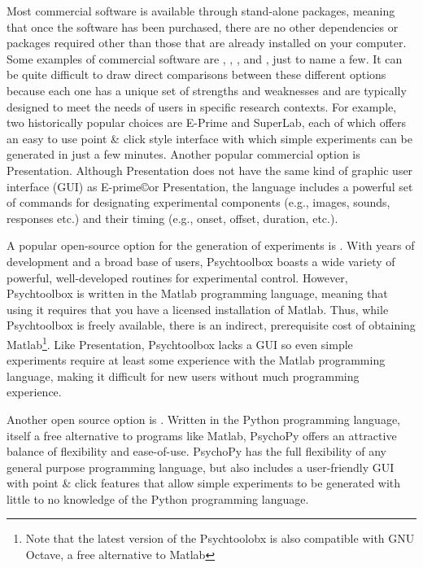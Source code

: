 Most commercial software is available through stand-alone packages, meaning that once the software has been purchased, there are no other dependencies or packages required other than those that are already installed on your computer. Some examples of commercial software are , , , and , just to name a few. It can be quite difficult to draw direct comparisons between these different options because each one has a unique set of strengths and weaknesses and are typically designed to meet the needs of users in specific research contexts. For example, two historically popular choices are E-Prime and SuperLab, each of which offers an easy to use point \& click style interface with which simple experiments can be generated in just a few minutes. Another popular commercial option is Presentation.  Although Presentation does not have the same kind of graphic user interface (GUI) as E-prime\copyright or Presentation, the language includes a powerful set of commands for designating experimental components (e.g., images, sounds, responses etc.) and their timing (e.g., onset, offset, duration, etc.).

 A popular open-source option for the generation of experiments is . With years of development and a broad base of users, Psychtoolbox boasts a wide variety of powerful, well-developed routines for experimental control. However, Psychtoolbox is written in the Matlab programming language, meaning that using it requires that you have a licensed installation of Matlab. Thus, while Psychtoolbox is freely available, there is an indirect, prerequisite cost of obtaining Matlab\footnote{Note that the latest version of the Psychtoolobx is also compatible with GNU Octave, a free alternative to Matlab}. Like Presentation, Psychtoolbox lacks a GUI so even simple experiments require at least some experience with the Matlab programming language, making it difficult for new users without much programming experience.
 
Another open source option is . Written in the Python programming language, itself a free alternative to programs like Matlab, PsychoPy offers an attractive balance of flexibility and ease-of-use.  PsychoPy has the full flexibility of any general purpose programming language, but also includes a user-friendly GUI with point \& click features that allow simple experiments to be generated with little to no knowledge of the Python programming language.

